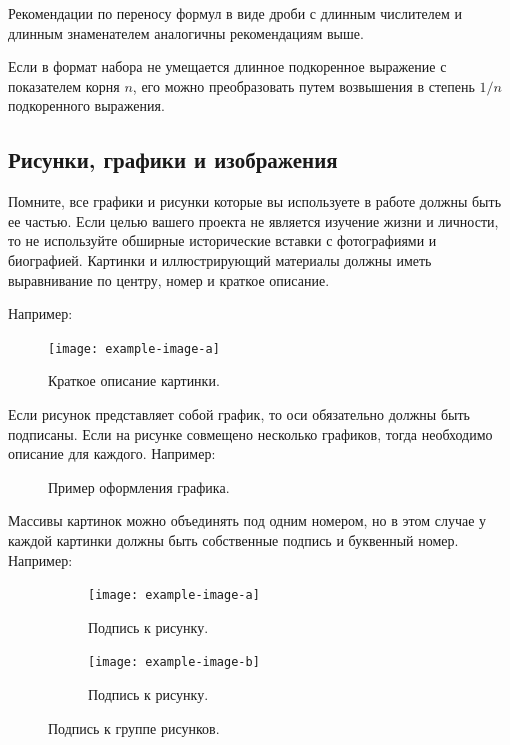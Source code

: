 Рекомендации по переносу формул в виде дроби с длинным числите­лем и длинным знаменателем аналогичны рекомендациям выше.

Если в формат набора не умещается длинное подкоренное выражение с показателем корня \(n\), его можно преобразовать путем возвышения в степень \(1/n\) подкоренного выражения.

\subsection{Рисунки, графики и изображения}
\par Помните, все графики и рисунки которые вы используете в работе должны быть ее частью. Если целью вашего проекта не является изучение жизни и личности, то не используйте обширные исторические вставки с фотографиями и биографией.
Картинки и иллюстрирующий материалы должны иметь выравнивание по центру, номер и краткое описание. 

Например:
\begin{figure}[H]
    \centering
    \texttt{[image: example-image-a]}
    \caption{Краткое описание картинки.}
\end{figure} 
\par Если рисунок представляет собой график, то оси обязательно должны быть подписаны. Если на рисунке совмещено несколько графиков, тогда необходимо описание для каждого. Например:
 
\begin{figure}[H]
    \centering
        \caption{Пример оформления графика.}
\end{figure}
 
\par Массивы картинок можно объединять под одним номером, но в этом случае у каждой картинки должны быть 
собственные подпись и буквенный номер. 
Например:~%
\begin{figure}[H]
    \centering
    \begin{subfigure}[t]{0.45\textwidth}
        \centering
        \texttt{[image: example-image-a]}
        \caption{Подпись к рисунку.}
    \end{subfigure}
    \begin{subfigure}[t]{0.45\textwidth}
        \centering
        \texttt{[image: example-image-b]}
        \caption{Подпись к рисунку.}
    \end{subfigure}
    \caption{Подпись к группе рисунков.}
\end{figure}
